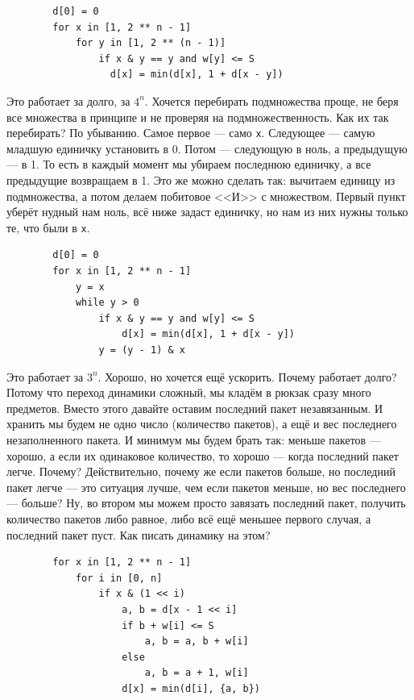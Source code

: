 \documentclass{article}
\newcommand{\pseudo}{PseudoLexer.py:PseudoLexer -x}
\newcommand{\pseudocode}[1]{\texttt{#1}}
\begin{document}
    \begin{verbatim}
        d[0] = 0
        for x in [1, 2 ** n - 1]
            for y in [1, 2 ** (n - 1)]
                if x & y == y and w[y] <= S
                  d[x] = min(d[x], 1 + d[x - y])
    \end{verbatim}
    Это работает за долго, за $4^n$. Хочется перебирать подмножества проще, не беря все множества в принципе и не проверяя на подмножественность. Как их так перебирать? По убыванию. Самое первое --- само \pseudocode{x}. Следующее --- самую младшую единичку установить в 0. Потом --- следующую в ноль, а предыдущую --- в 1. То есть в каждый момент мы убираем последнюю единичку, а все предыдущие возвращаем в 1. Это же можно сделать так: вычитаем единицу из подмножества, а потом делаем побитовое <<И>> с множеством. Первый пункт уберёт нудный нам ноль, всё ниже задаст единичку, но нам из них нужны только те, что были в \pseudocode{x}.
    \begin{verbatim}
        d[0] = 0
        for x in [1, 2 ** n - 1]
            y = x
            while y > 0
                if x & y == y and w[y] <= S
                    d[x] = min(d[x], 1 + d[x - y])
                y = (y - 1) & x
    \end{verbatim}
    Это работает за $3^n$. Хорошо, но хочется ещё ускорить. Почему работает долго? Потому что переход динамики сложный, мы кладём в рюкзак сразу много предметов. Вместо этого давайте оставим последний пакет незавязанным. И хранить мы будем не одно число (количество пакетов), а ещё и вес последнего незаполненного пакета. И минимум мы будем брать так: меньше пакетов --- хорошо, а если их одинаковое количество, то хорошо --- когда последний пакет легче. Почему? Действительно, почему же если пакетов больше, но последний пакет легче --- это ситуация лучше, чем если пакетов меньше, но вес последнего --- больше? Ну, во втором мы можем просто завязать последний пакет, получить количество пакетов либо равное, либо всё ещё меньшее первого случая, а последний пакет пуст. Как писать динамику на этом?
    \begin{verbatim}
        for x in [1, 2 ** n - 1]
            for i in [0, n]
                if x & (1 << i)
                    a, b = d[x - 1 << i]
                    if b + w[i] <= S
                        a, b = a, b + w[i]
                    else
                        a, b = a + 1, w[i]
                    d[x] = min(d[i], {a, b})
    \end{verbatim}
\end{document}

